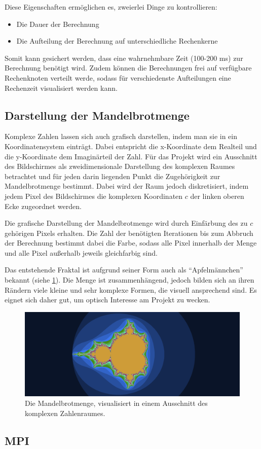 Diese Eigenschaften ermöglichen es, zweierlei Dinge zu kontrollieren:
\begin{itemize}
    \item Die Dauer der Berechnung
    \item Die Aufteilung der Berechnung auf unterschiedliche Rechenkerne
\end{itemize}

Somit kann gesichert werden, dass eine wahrnehmbare Zeit (100-200 ms) zur Berechnung benötigt wird.
Zudem können die Berechnungen frei auf verfügbare Rechenknoten verteilt werde, sodass
für verschiedenste Aufteilungen eine Rechenzeit visualisiert werden kann.

\subsection{Darstellung der Mandelbrotmenge}

Komplexe Zahlen lassen sich auch grafisch darstellen, indem man sie in ein Koordinatensystem einträgt.
Dabei entspricht die x-Koordinate dem Realteil und die y-Koordinate dem Imaginärteil der Zahl.
Für das Projekt wird ein Ausschnitt des Bildschirmes als zweidimensionale Darstellung des komplexen Raumes
betrachtet und für jeden darin liegenden Punkt die Zugehörigkeit zur Mandelbrotmenge bestimmt.
Dabei wird der Raum jedoch diskretisiert, indem jedem Pixel des Bildschirmes die komplexen Koordinaten $c$
der linken oberen Ecke zugeordnet werden.

Die grafische Darstellung der Mandelbrotmenge wird durch Einfärbung des zu $c$ gehörigen Pixels erhalten.
Die Zahl der benötigten Iterationen bis zum Abbruch der Berechnung bestimmt dabei die Farbe, sodass alle Pixel
innerhalb der Menge und alle Pixel außerhalb jeweils gleichfarbig sind.

Das entstehende Fraktal ist aufgrund seiner Form auch als “Apfelmännchen” bekannt (siehe \ref{mandelbrot_visualisierung_beispiel}).
Die Menge ist zusammenhängend, jedoch bilden sich an ihren Rändern viele kleine und sehr komplexe Formen, die visuell ansprechend sind. Es eignet sich daher gut, um optisch Interesse am Projekt zu wecken.

\begin{figure}
    \label{mandelbrot_visualisierung_beispiel}
    \centering
        \includegraphics[width=0.9\linewidth]{img/Mandelbrot_visualization_example.png}
    \caption{Die Mandelbrotmenge, visualisiert in einem Ausschnitt des komplexen Zahlenraumes.}
\end{figure}

\subsection{MPI}


